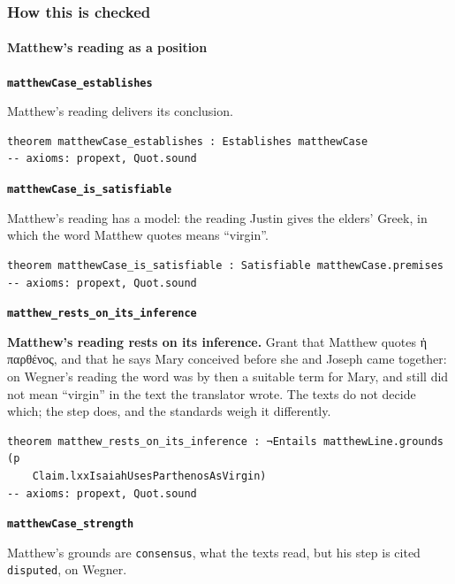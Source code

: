 \documentclass[11pt]{article}
\begin{document}
\subsubsection*{How this is checked}
\paragraph*{Matthew’s reading as a position}
\leavevmode\par\nobreak
\par\medskip\noindent\textbf{\texttt{matthew\allowbreak{}Case\_\allowbreak{}establishes}}\par\nobreak\noindent
Matthew’s reading delivers its conclusion.

{\small\begin{verbatim}
theorem matthewCase_establishes : Establishes matthewCase
-- axioms: propext, Quot.sound
\end{verbatim}}
\par\medskip\noindent\textbf{\texttt{matthew\allowbreak{}Case\_\allowbreak{}is\_\allowbreak{}satisfiable}}\par\nobreak\noindent
Matthew’s reading has a model: the reading Justin gives the elders’ Greek, in which the word Matthew quotes means “virgin”.

{\small\begin{verbatim}
theorem matthewCase_is_satisfiable : Satisfiable matthewCase.premises
-- axioms: propext, Quot.sound
\end{verbatim}}
\par\medskip\noindent\textbf{\texttt{matthew\_\allowbreak{}rests\_\allowbreak{}on\_\allowbreak{}its\_\allowbreak{}inference}}\par\nobreak\noindent
\textbf{Matthew’s reading rests on its inference.} Grant that Matthew quotes ἡ παρθένος, and that he says Mary conceived before she and Joseph came together: on Wegner’s reading the word was by then a suitable term for Mary, and still did not mean “virgin” in the text the translator wrote. The texts do not decide which; the step does, and the standards weigh it differently.

{\small\begin{verbatim}
theorem matthew_rests_on_its_inference : ¬Entails matthewLine.grounds (p
    Claim.lxxIsaiahUsesParthenosAsVirgin)
-- axioms: propext, Quot.sound
\end{verbatim}}
\par\medskip\noindent\textbf{\texttt{matthew\allowbreak{}Case\_\allowbreak{}strength}}\par\nobreak\noindent
Matthew’s grounds are \texttt{consensus}, what the texts read, but his step is cited \texttt{disputed}, on Wegner.
\end{document}
